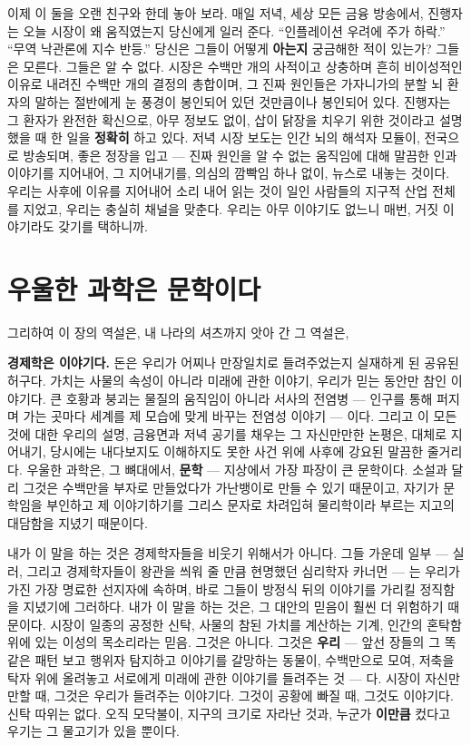이제 이 둘을 오랜 친구와 한데 놓아 보라. 매일 저녁, 세상 모든 금융 방송에서, 진행자는 오늘 시장이 왜 움직였는지 당신에게 일러 준다. ``인플레이션 우려에 주가 하락.'' ``무역 낙관론에 지수 반등.'' 당신은 그들이 어떻게 \textbf{아는지} 궁금해한 적이 있는가? 그들은 모른다. 그들은 알 수 없다. 시장은 수백만 개의 사적이고 상충하며 흔히 비이성적인 이유로 내려진 수백만 개의 결정의 총합이며, 그 진짜 원인들은 가자니가의 분할 뇌 환자의 말하는 절반에게 눈 풍경이 봉인되어 있던 것만큼이나 봉인되어 있다. 진행자는 그 환자가 완전한 확신으로, 아무 정보도 없이, 삽이 닭장을 치우기 위한 것이라고 설명했을 때 한 일을 \textbf{정확히} 하고 있다. 저녁 시장 보도는 인간 뇌의 해석자 모듈이, 전국으로 방송되며, 좋은 정장을 입고 — 진짜 원인을 알 수 없는 움직임에 대해 말끔한 인과 이야기를 지어내어, 그 지어내기를, 의심의 깜빡임 하나 없이, 뉴스로 내놓는 것이다. 우리는 사후에 이유를 지어내어 소리 내어 읽는 것이 일인 사람들의 지구적 산업 전체를 지었고, 우리는 충실히 채널을 맞춘다. 우리는 아무 이야기도 없느니 매번, 거짓 이야기라도 갖기를 택하니까.

\section*{우울한 과학은 문학이다}

그리하여 이 장의 역설은, 내 나라의 셔츠까지 앗아 간 그 역설은,

\textbf{경제학은 이야기다.} 돈은 우리가 어찌나 만장일치로 들려주었는지 실재하게 된 공유된 허구다. 가치는 사물의 속성이 아니라 미래에 관한 이야기, 우리가 믿는 동안만 참인 이야기다. 큰 호황과 붕괴는 물질의 움직임이 아니라 서사의 전염병 — 인구를 통해 퍼지며 가는 곳마다 세계를 제 모습에 맞게 바꾸는 전염성 이야기 — 이다. 그리고 이 모든 것에 대한 우리의 설명, 금융면과 저녁 공기를 채우는 그 자신만만한 논평은, 대체로 지어내기, 당시에는 내다보지도 이해하지도 못한 사건 위에 사후에 강요된 말끔한 줄거리다. 우울한 과학은, 그 뼈대에서, \textbf{문학} — 지상에서 가장 파장이 큰 문학이다. 소설과 달리 그것은 수백만을 부자로 만들었다가 가난뱅이로 만들 수 있기 때문이고, 자기가 문학임을 부인하고 제 이야기하기를 그리스 문자로 차려입혀 물리학이라 부르는 지고의 대담함을 지녔기 때문이다.

내가 이 말을 하는 것은 경제학자들을 비웃기 위해서가 아니다. 그들 가운데 일부 — 실러, 그리고 경제학자들이 왕관을 씌워 줄 만큼 현명했던 심리학자 카너먼 — 는 우리가 가진 가장 명료한 선지자에 속하며, 바로 그들이 방정식 뒤의 이야기를 가리킬 정직함을 지녔기에 그러하다. 내가 이 말을 하는 것은, 그 대안의 믿음이 훨씬 더 위험하기 때문이다. 시장이 일종의 공정한 신탁, 사물의 참된 가치를 계산하는 기계, 인간의 혼탁함 위에 있는 이성의 목소리라는 믿음. 그것은 아니다. 그것은 \textbf{우리} — 앞선 장들의 그 똑같은 패턴 보고 행위자 탐지하고 이야기를 갈망하는 동물이, 수백만으로 모여, 저축을 탁자 위에 올려놓고 서로에게 미래에 관한 이야기를 들려주는 것 — 다. 시장이 자신만만할 때, 그것은 우리가 들려주는 이야기다. 그것이 공황에 빠질 때, 그것도 이야기다. 신탁 따위는 없다. 오직 모닥불이, 지구의 크기로 자라난 것과, 누군가 \textbf{이만큼} 컸다고 우기는 그 물고기가 있을 뿐이다.

